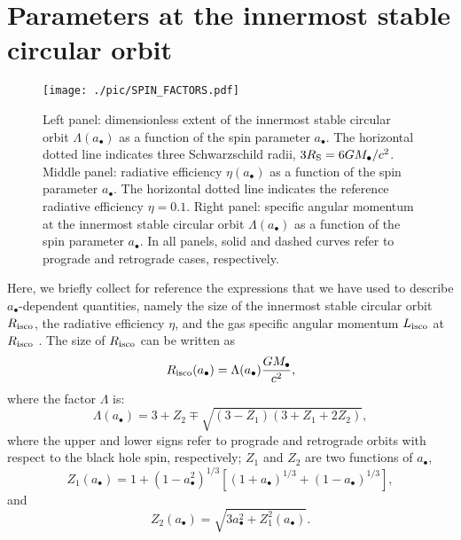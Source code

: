 \documentclass[a4paper,fleqn,usenatbib]{mnras}
\begin{document}

\section{Parameters at the innermost stable circular orbit}\label{appendix_afunc}

\begin{figure*}
\begin{center}
\texttt{[image: ./pic/SPIN\_FACTORS.pdf]}
\caption{Left panel: dimensionless extent of the innermost stable circular orbit $\Lambda(a_{\bullet})$ as a function of the spin parameter $a_{\bullet}$.
The horizontal dotted line indicates three Schwarzschild radii, $3 R_{\rm S} = 6 G M_{\bullet} / c^2$.
Middle panel: radiative efficiency $\eta(a_{\bullet})$ as a function of the spin parameter $a_{\bullet}$.
The horizontal dotted line indicates the reference radiative efficiency $\eta = 0.1$.
Right panel: specific angular momentum at the innermost stable circular orbit $\Lambda(a_{\bullet})$ as a function of the spin parameter $a_{\bullet}$.
In all panels, solid and dashed curves refer to prograde and retrograde cases, respectively.
}
\label{fig_spin_factors}
\end{center}
\end{figure*}

Here, we briefly collect for reference the expressions that we have used to describe $a_{\bullet}$-dependent quantities, namely the size of the innermost stable circular orbit $R_{\rm isco}$, the radiative efficiency $\eta$, and the gas specific angular momentum $L_{\rm isco}$ at $R_{\rm isco}$ \citep{bardeen+72}.
The size of $R_{\rm isco}$ can be written as
\begin{equation}
R_{\rm isco}(a_{\bullet}) = \Lambda(a_{\bullet}) \frac{G M_{\bullet}}{c^2},
\end{equation}
where the factor $\Lambda$ is:
\begin{equation}
\Lambda(a_{\bullet}) = 3 + Z_{2} \mp \sqrt{(3 - Z_{1}) (3 + Z_{1} + 2 Z_{2})},
\end{equation}
where the upper and lower signs refer to prograde and retrograde orbits with respect to the black hole spin, respectively; $Z_{1}$ and $Z_{2}$ are two functions of $a_{\bullet}$,
\begin{equation}
Z_{1}(a_{\bullet}) = 1 + (1 - a_{\bullet}^2)^{1/3} \left[ (1 + a_{\bullet})^{1/3} +  (1 - a_{\bullet})^{1/3} \right],
\end{equation}
and
\begin{equation}
Z_{2}(a_{\bullet}) = \sqrt{3 a_{\bullet}^2 + Z_{1}^2(a_\bullet)}.
\end{equation}
\end{document}
